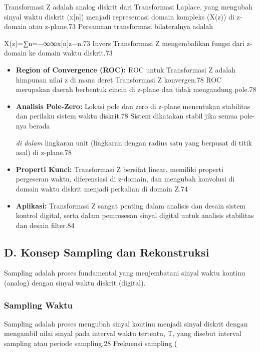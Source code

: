 \documentclass[
  letterpaper,
  DIV=11,
  numbers=noendperiod]{scrreprt}
\begin{document}
Transformasi Z adalah analog diskrit dari Transformasi Laplace, yang
mengubah sinyal waktu diskrit (x{[}n{]}) menjadi representasi domain
kompleks (X(z)) di z-domain atau z-plane.73 Persamaan transformasi
bilateralnya adalah

X(z)=∑n=−∞∞\hspace{0pt}x{[}n{]}z−n.73 Invers Transformasi Z
mengembalikan fungsi dari z-domain ke domain waktu diskrit.73

\begin{itemize}
\item
  \textbf{Region of Convergence (ROC):} ROC untuk Transformasi Z adalah
  himpunan nilai z di mana deret Transformasi Z konvergen.78 ROC
  merupakan daerah berbentuk cincin di z-plane dan tidak mengandung
  pole.78
\item
  \textbf{Analisis Pole-Zero:} Lokasi pole dan zero di z-plane
  menentukan stabilitas dan perilaku sistem waktu diskrit.78 Sistem
  dikatakan stabil jika semua pole-nya berada

  \emph{di dalam} lingkaran unit (lingkaran dengan radius satu yang
  berpusat di titik asal) di z-plane.78
\item
  \textbf{Properti Kunci:} Transformasi Z bersifat linear, memiliki
  properti pergeseran waktu, diferensiasi di z-domain, dan mengubah
  konvolusi di domain waktu diskrit menjadi perkalian di domain Z.74
\item
  \textbf{Aplikasi:} Transformasi Z sangat penting dalam analisis dan
  desain sistem kontrol digital, serta dalam pemrosesan sinyal digital
  untuk analisis stabilitas dan desain filter.84
\end{itemize}

\subsection{D. Konsep Sampling dan
Rekonstruksi}\label{d.-konsep-sampling-dan-rekonstruksi}

Sampling adalah proses fundamental yang menjembatani sinyal waktu
kontinu (analog) dengan sinyal waktu diskrit (digital).

\subsubsection{Sampling Waktu}\label{sampling-waktu}

Sampling adalah proses mengubah sinyal kontinu menjadi sinyal diskrit
dengan mengambil nilai sinyal pada interval waktu tertentu, T, yang
disebut interval sampling atau periode sampling.28 Frekuensi sampling (
\end{document}
